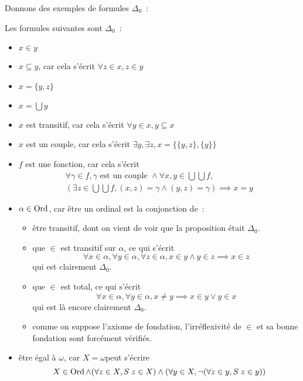 Donnons des exemples de formules $\Delta_0$~:

\begin{example}
  Les formules suivantes sont $\Delta_0$~:
  \begin{itemize}
  \item $x\in y$
  \item $x\subseteq y$, car cela s'écrit $\forall z \in x, z \in y$
  \item $x = \{y,z\}$
  \item $x = \bigcup y$
  \item $x$ est transitif, car cela s'écrit $\forall y \in x, y\subseteq x$
  \item $x$ est un couple, car cela s'écrit
    $\exists y,\exists z, x = \{\{y,z\},\{y\}\}$
  \item $f$ est une fonction, car cela s'écrit
    \begin{multline*}
      \forall \gamma \in f, \gamma\text{ est un couple }\land
      \forall x,y \in \bigcup \bigcup f,\\
      (\exists z \in \bigcup\bigcup f,
      (x,z) = \gamma \land (y,z) = \gamma) \implies x = y
    \end{multline*}
  \item $\alpha \in \operatorname{Ord}$, car être un ordinal est la conjonction de~:
    \begin{itemize}
    \item être transitif, dont on vient de voir que la proposition était
      $\Delta_0$.
    \item que $\in$ est transitif sur $\alpha$, ce qui s'écrit
      \[\forall x \in \alpha, \forall y \in \alpha, \forall z \in \alpha,
      x\in y \land y \in z \implies x \in z\] qui est clairement $\Delta_0$.
    \item que $\in$ est total, ce qui s'écrit
      \[\forall x \in \alpha, \forall y \in \alpha, x \neq y \implies
      x \in y \lor y \in x\] qui est là encore clairement $\Delta_0$.
    \item comme on suppose l'axiome de fondation, l'irréflexivité de $\in$ et sa
      bonne fondation sont forcément vérifiés.
    \end{itemize}
  \item être égal à $\omega$, car \og $X = \omega$\fg peut s'écrire
    \[X\in \operatorname{Ord} \land (\forall z \in X, S\;z \in X) \land
    (\forall y \in X, \lnot (\forall z \in y, S\;z \in y))\]
  \end{itemize}
\end{example}

